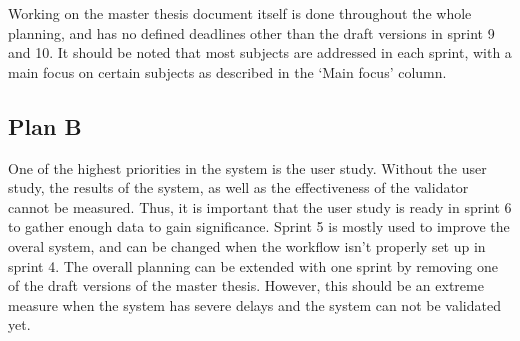 \documentclass{../resources/acm_proc_article-sp}
\begin{document}
Working on the master thesis document itself is done throughout the whole planning, and has no defined deadlines other than the draft versions in sprint 9 and 10. It should be noted that most subjects are addressed in each sprint, with a main focus on certain subjects as described in the `Main focus' column.

\subsection{Plan B}

One of the highest priorities in the system is the user study. Without the user study, the results of the system, as well as the effectiveness of the validator cannot be measured. Thus, it is important that the user study is ready in sprint 6 to gather enough data to gain significance. Sprint 5 is mostly used to improve the overal system, and can be changed when the workflow isn't properly set up in sprint 4. The overall planning can be extended with one sprint by removing one of the draft versions of the master thesis. However, this should be an extreme measure when the system has severe delays and the system can not be validated yet.

\printbibliography

\balancecolumns
\end{document}
